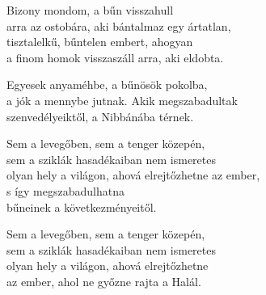 \begin{dhpverse}

 Bizony mondom, a bűn visszahull\\
arra az ostobára, aki bántalmaz egy ártatlan,\\
tisztalelkű, bűntelen embert, ahogyan\\
a finom homok visszaszáll arra, aki eldobta.

 Egyesek anyaméhbe, a bűnösök pokolba,\\
a jók a mennybe jutnak. Akik megszabadultak\\
szenvedélyeiktől, a Nibbánába térnek.

 Sem a levegőben, sem a tenger közepén,\\
sem a sziklák hasadékaiban nem ismeretes\\
olyan hely a világon, ahová elrejtőzhetne az ember,\\
s így megszabadulhatna\\
bűneinek a következményeitől.

 Sem a levegőben, sem a tenger közepén,\\
sem a sziklák hasadékaiban nem ismeretes\\
olyan hely a világon, ahová elrejtőzhetne\\
az ember, ahol ne győzne rajta a Halál.

\end{dhpverse}
